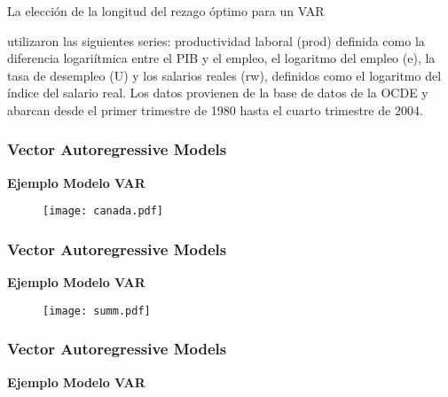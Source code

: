 \documentclass[spanish,xcolor=table]{beamer}
\begin{document}
\begin{section}{La elecci\'on de la longitud del rezago \'optimo para un VAR}
\begin{frame}
\cite{lutkepohl2004applied} utilizaron las siguientes series: productividad laboral (prod) definida como la diferencia logari\'{i}tmica entre el PIB y el empleo, el logaritmo del empleo (e), la tasa de desempleo (U) y los salarios reales (rw), definidos como el logaritmo del \'{i}ndice del salario real. Los datos provienen de la base de datos de la OCDE y abarcan desde el primer trimestre de 1980 hasta el cuarto trimestre de 2004.


\end{frame}

\begin{frame}
\frametitle{Vector Autoregressive Models}
\textbf{Ejemplo Modelo VAR}


\begin{figure}[t!]
\texttt{[image: canada.pdf]}
\end{figure}

\end{frame}
\begin{frame}
\frametitle{Vector Autoregressive Models}
\textbf{Ejemplo Modelo VAR}


\begin{figure}[t!]
\texttt{[image: summ.pdf]}
\end{figure}

\end{frame}

\begin{frame}
\frametitle{Vector Autoregressive Models}
\textbf{Ejemplo Modelo VAR}


\end{frame}
\end{section}
\end{document}
